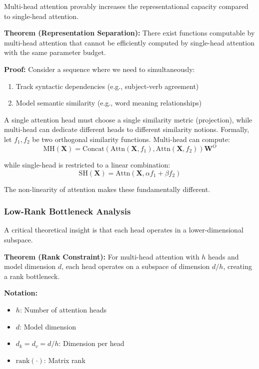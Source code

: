 \documentclass[11pt]{article}
\begin{document}
Multi-head attention provably increases the representational capacity compared to single-head attention.

\textbf{Theorem (Representation Separation):} There exist functions computable by multi-head attention that cannot be efficiently computed by single-head attention with the same parameter budget.

\textbf{Proof:} Consider a sequence where we need to simultaneously:
\begin{enumerate}
    \item Track syntactic dependencies (e.g., subject-verb agreement)
    \item Model semantic similarity (e.g., word meaning relationships)
\end{enumerate}

A single attention head must choose a single similarity metric (projection), while multi-head can dedicate different heads to different similarity notions. Formally, let $f_1, f_2$ be two orthogonal similarity functions. Multi-head can compute:
\begin{equation}
\text{MH}(\mathbf{X}) = \text{Concat}(\text{Attn}(\mathbf{X}, f_1), \text{Attn}(\mathbf{X}, f_2))\mathbf{W}^O
\end{equation}

while single-head is restricted to a linear combination:
\begin{equation}
\text{SH}(\mathbf{X}) = \text{Attn}(\mathbf{X}, \alpha f_1 + \beta f_2)
\end{equation}

The non-linearity of attention makes these fundamentally different.

\subsubsection{Low-Rank Bottleneck Analysis}

A critical theoretical insight is that each head operates in a lower-dimensional subspace.

\textbf{Theorem (Rank Constraint):} For multi-head attention with $h$ heads and model dimension $d$, each head operates on a subspace of dimension $d/h$, creating a rank bottleneck.

\begin{notationbox}
\textbf{Notation:}
\begin{itemize}
    \item $h$: Number of attention heads
    \item $d$: Model dimension
    \item $d_k = d_v = d/h$: Dimension per head
    \item $\text{rank}(\cdot)$: Matrix rank
\end{itemize}
\end{notationbox}
\end{document}

